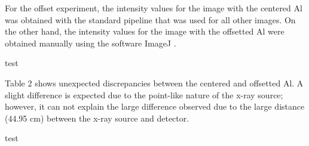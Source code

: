 For the offset experiment, the intensity values for the image with the centered Al was obtained with the standard pipeline that was used for all other images. On the other hand, the intensity values for the image with the offsetted Al were obtained manually using the software ImageJ \cite{ImageJ}.


\begin{table}[H]
    \small
    \noindent\makebox[\textwidth]{%
    
    }
    \caption{test}
\end{table}

Table 2 shows unexpected discrepancies between the centered and offsetted Al. A slight difference is expected due to the point-like nature of the x-ray source; however, it can not explain the large difference observed due to the large distance (44.95 cm) between the x-ray source and detector.


\begin{table}[H]
    \small
    \noindent\makebox[\textwidth]{%
    
    }
    \caption{test}
\end{table}












